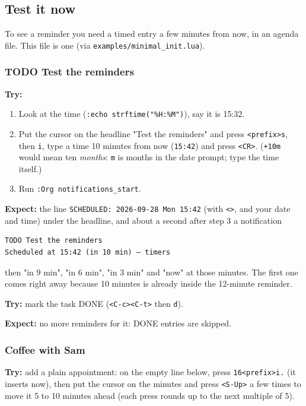 \subsection{Test it now}
\label{sec:orgb0f1a4e}
To see a reminder you need a timed entry a few minutes from now, in an
agenda file. This file is one (via \texttt{examples/minimal\_init.lua}).
\subsubsection{{\bfseries\sffamily TODO} Test the reminders}
\label{sec:org99af24e}

\textbf{Try:}
\begin{enumerate}
\item Look at the time (\texttt{:echo strftime("\%H:\%M")}), say it is 15:32.
\item Put the cursor on the headline "Test the reminders" and press
\texttt{<prefix>s}, then \texttt{i}, type a time 10 minutes from now (\texttt{15:42}) and
press \texttt{<CR>}. (\texttt{+10m} would mean ten \emph{months}: \texttt{m} is months in the
date prompt; type the time itself.)
\item Run \texttt{:Org notifications\_start}.
\end{enumerate}

\textbf{Expect:} the line \texttt{SCHEDULED: 2026-09-28 Mon 15:42} (with \texttt{<>}, and your
date and time) under the headline, and about a second after step 3 a
notification

\begin{verbatim}
TODO Test the reminders
Scheduled at 15:42 (in 10 min) — timers
\end{verbatim}

then "in 9 min", "in 6 min", "in 3 min" and "now" at those minutes. The
first one comes right away because 10 minutes is already inside the
12-minute reminder.

\textbf{Try:} mark the task DONE (\texttt{<C-c><C-t>} then \texttt{d}).

\textbf{Expect:} no more reminders for it: DONE entries are skipped.
\subsubsection{Coffee with Sam}
\label{sec:org9b58fed}

\textbf{Try:} add a plain appointment: on the empty line below, press
\texttt{16<prefix>i.} (it inserts now), then put the cursor on the minutes and
press \texttt{<S-Up>} a few times to move it 5 to 10 minutes ahead (each press
rounds up to the next multiple of 5).


